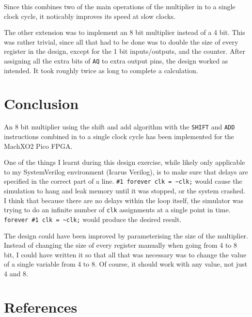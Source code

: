 \documentclass[a4paper,11pt]{article}
\begin{document}
Since this combines two of the main operations of the multiplier in to a single clock cycle, it noticably improves its speed at slow clocks.

The other extension was to implement an 8 bit multiplier instead of a 4 bit. This was rather trivial, since all that had to be done was to double the size of every register in the design, except for the 1 bit inputs/outputs, and the counter. After assigning all the extra bits of \lstinline{AQ} to extra output pins, the design worked as intended. It took roughly twice as long to complete a calculation.

\section{Conclusion}

An 8 bit multiplier using the shift and add algorithm with the \lstinline{SHIFT} and \lstinline{ADD} instructions combined in to a single clock cycle has been implemented for the MachXO2 Pico FPGA.

One of the things I learnt during this design exercise, while likely only applicable to my SystemVerilog environment (Icarus Verilog), is to make sure that delays are specified in the correct part of a line. \lstinline{#1 forever clk = ~clk;} would cause the simulation to hang and leak memory until it was stopped, or the system crashed. I think that because there are no delays within the loop itself, the simulator was trying to do an infinite number of \lstinline{clk} assignments at a single point in time. \lstinline{forever #1 clk = ~clk;} would produce the desired result.

The design could have been improved by parameterising the size of the multiplier. Instead of changing the size of every register manually when going from 4 to 8 bit, I could have written it so that all that was necessary was to change the value of a single variable from 4 to 8. Of course, it should work with any value, not just 4 and 8.

\section{References}




  
\end{document}
